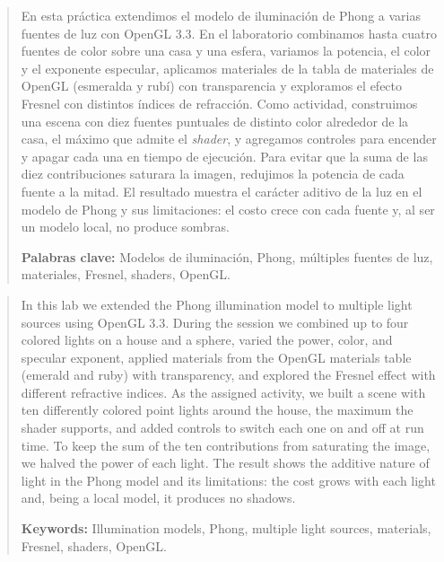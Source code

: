 
\begin{abstract}
En esta práctica extendimos el modelo de iluminación de Phong a varias fuentes de luz con OpenGL 3.3. En el laboratorio combinamos hasta cuatro fuentes de color sobre una casa y una esfera, variamos la potencia, el color y el exponente especular, aplicamos materiales de la tabla de materiales de OpenGL (esmeralda y rubí) con transparencia y exploramos el efecto Fresnel con distintos índices de refracción. Como actividad, construimos una escena con diez fuentes puntuales de distinto color alrededor de la casa, el máximo que admite el \textit{shader}, y agregamos controles para encender y apagar cada una en tiempo de ejecución. Para evitar que la suma de las diez contribuciones saturara la imagen, redujimos la potencia de cada fuente a la mitad. El resultado muestra el carácter aditivo de la luz en el modelo de Phong y sus limitaciones: el costo crece con cada fuente y, al ser un modelo local, no produce sombras.

\vspace{0.3cm}
\noindent\textbf{Palabras clave:} Modelos de iluminación, Phong, múltiples fuentes de luz, materiales, Fresnel, shaders, OpenGL.
\end{abstract}

\vspace{0.5cm}

\renewcommand{\abstractname}{Abstract}
\begin{abstract}
In this lab we extended the Phong illumination model to multiple light sources using OpenGL 3.3. During the session we combined up to four colored lights on a house and a sphere, varied the power, color, and specular exponent, applied materials from the OpenGL materials table (emerald and ruby) with transparency, and explored the Fresnel effect with different refractive indices. As the assigned activity, we built a scene with ten differently colored point lights around the house, the maximum the shader supports, and added controls to switch each one on and off at run time. To keep the sum of the ten contributions from saturating the image, we halved the power of each light. The result shows the additive nature of light in the Phong model and its limitations: the cost grows with each light and, being a local model, it produces no shadows.

\vspace{0.3cm}
\noindent\textbf{Keywords:} Illumination models, Phong, multiple light sources, materials, Fresnel, shaders, OpenGL.
\end{abstract}

\vspace{0.6cm}
